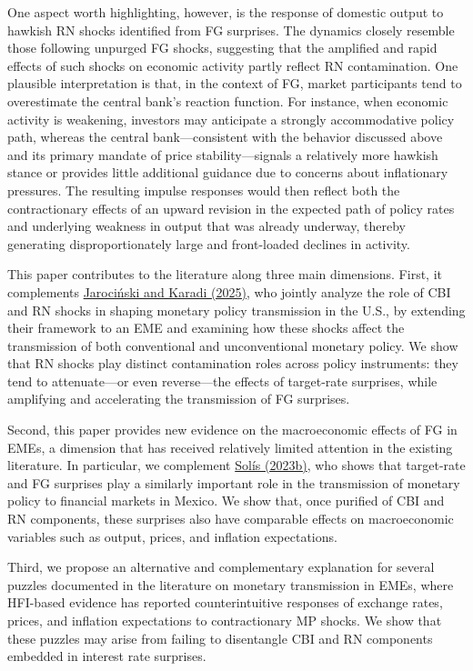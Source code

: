 \documentclass[12pt, reqno]{article}
\begin{document}
One aspect worth highlighting, however, is the response of domestic output to hawkish RN shocks identified from FG surprises. The dynamics closely resemble those following unpurged FG shocks, suggesting that the amplified and rapid effects of such shocks on economic activity partly reflect RN contamination. One plausible interpretation is that, in the context of FG, market participants tend to overestimate the central bank’s reaction function. For instance, when economic activity is weakening, investors may anticipate a strongly accommodative policy path, whereas the central bank—consistent with the behavior discussed above and its primary mandate of price stability—signals a relatively more hawkish stance or provides little additional guidance due to concerns about inflationary pressures. The resulting impulse responses would then reflect both the contractionary effects of an upward revision in the expected path of policy rates and underlying weakness in output that was already underway, thereby generating disproportionately large and front-loaded declines in activity.

This paper contributes to the literature along three main dimensions. First, it complements \hyperlink{Jarociński and Karadi (2025)}{Jarociński and Karadi (2025)}, who jointly analyze the role of CBI and RN shocks in shaping monetary policy transmission in the U.S., by extending their framework to an EME and examining how these shocks affect the transmission of both conventional and unconventional monetary policy. We show that RN shocks play distinct contamination roles across policy instruments: they tend to attenuate—or even reverse—the effects of target-rate surprises, while amplifying and accelerating the transmission of FG surprises. 

Second, this paper provides new evidence on the macroeconomic effects of FG in EMEs, a dimension that has received relatively limited attention in the existing literature. In particular, we complement \hyperlink{Solis (2023b)}{Solís (2023b)}, who shows that target-rate and FG surprises play a similarly important role in the transmission of monetary policy to financial markets in Mexico. We show that, once purified of CBI and RN components, these surprises also have comparable effects on macroeconomic variables such as output, prices, and inflation expectations. 

Third, we propose an alternative and complementary explanation for several puzzles documented in the literature on monetary transmission in EMEs, where HFI-based evidence has reported counterintuitive responses of exchange rates, prices, and inflation expectations to contractionary MP shocks. We show that these puzzles may arise from failing to disentangle CBI and RN components embedded in interest rate surprises.
\end{document}
